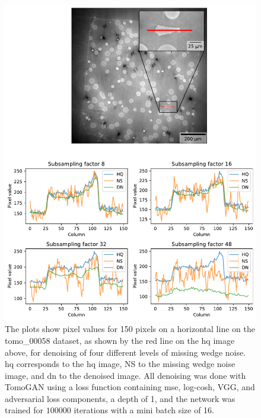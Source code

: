 \begin{figure}[htbp]
  \centering
  \includegraphics[width=.95\textwidth]{figures/differentnoiselineplot1.pdf}
  \caption[Pixel value plot of denoising of different levels of noise on tomo\_00058]{The plots show pixel values for 150 pixels on a horizontal line on the tomo\_00058 dataset, as shown by the red line on the \acrlong{hq} image above, for denoising of four different levels of missing wedge noise. \acrshort{hq} corresponds to the \acrlong{hq} image, NS to the missing wedge noise image, and \acrshort{dn} to the denoised image. All denoising was done with TomoGAN using a loss function containing \acrshort{mse}, log-cosh, VGG, and adversarial loss components, a depth of 1, and the network was trained for $100 000$ iterations with a mini batch size of 16. }
  \label{fig:differentnoiselineplot1}
\end{figure}

